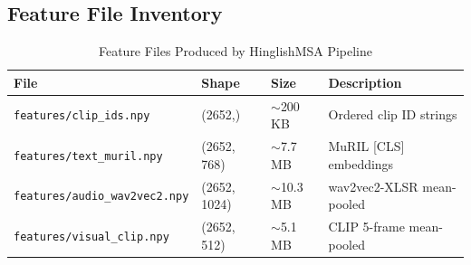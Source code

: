 \begin{appendices}
    \section{Feature File Inventory}

    \begin{table}[H]
    \centering
    \caption{Feature Files Produced by HinglishMSA Pipeline}
    \begin{tabular}{llll}
    \toprule
    \textbf{File} & \textbf{Shape} & \textbf{Size} & \textbf{Description} \\
    \midrule
    \texttt{features/clip\_ids.npy} & (2652,) & $\sim$200 KB & Ordered clip ID strings \\
    \texttt{features/text\_muril.npy} & (2652, 768) & $\sim$7.7 MB & MuRIL [CLS] embeddings \\
    \texttt{features/audio\_wav2vec2.npy} & (2652, 1024) & $\sim$10.3 MB & wav2vec2-XLSR mean-pooled \\
    \texttt{features/visual\_clip.npy} & (2652, 512) & $\sim$5.1 MB & CLIP 5-frame mean-pooled \\
    \bottomrule
    \end{tabular}
    \end{table}

\end{appendices}
